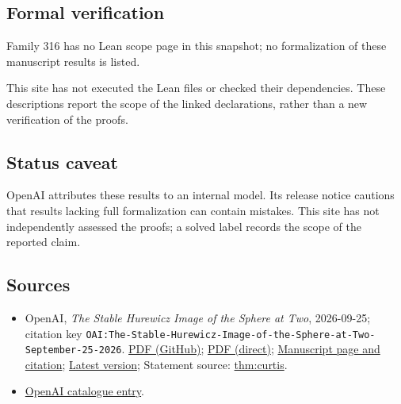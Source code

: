 \documentclass[11pt]{article}
\begin{document}
\subsection{Formal verification}
Family 316 has no Lean scope page in this snapshot; no formalization of these manuscript results is listed.

This site has not executed the Lean files or checked their dependencies. These descriptions report the scope of the linked declarations, rather than a new verification of the proofs.

\subsection{Status caveat}
OpenAI attributes these results to an internal model. Its release notice cautions that results lacking full formalization can contain mistakes. This site has not independently assessed the proofs; a solved label records the scope of the reported claim.

\subsection{Sources}
\begin{itemize}
\item OpenAI, \emph{The Stable Hurewicz Image of the Sphere at Two}, 2026-09-25; citation key \texttt{OAI:The-Stable-Hurewicz-Image-of-the-Sphere-at-Two-September-25-2026}. \href{https://github.com/openai/math/blob/adc7f1241b42e322a6451854ab7e4b4c146bf78a/preprints/The-Stable-Hurewicz-Image-of-the-Sphere-at-Two-September-25-2026/paper.pdf}{PDF (GitHub)}; \href{https://github.com/openai/math/raw/adc7f1241b42e322a6451854ab7e4b4c146bf78a/preprints/The-Stable-Hurewicz-Image-of-the-Sphere-at-Two-September-25-2026/paper.pdf}{PDF (direct)}; \href{https://github.com/openai/math/blob/adc7f1241b42e322a6451854ab7e4b4c146bf78a/preprints/The-Stable-Hurewicz-Image-of-the-Sphere-at-Two-September-25-2026/README.md}{Manuscript page and citation}; \href{https://github.com/openai/math/blob/main/preprints/The-Stable-Hurewicz-Image-of-the-Sphere-at-Two-September-25-2026/paper.pdf}{Latest version}; Statement source: \href{https://github.com/openai/math/blob/adc7f1241b42e322a6451854ab7e4b4c146bf78a/preprints/The-Stable-Hurewicz-Image-of-the-Sphere-at-Two-September-25-2026/build/introduction.tex\#L24}{thm:curtis}.
\item \href{https://github.com/openai/math/blob/adc7f1241b42e322a6451854ab7e4b4c146bf78a/CONTENTS.md}{OpenAI catalogue entry}.
\end{itemize}
\end{document}

